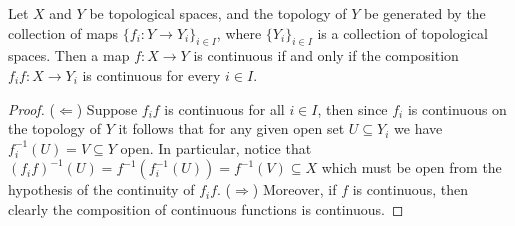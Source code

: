 \begin{proposition}
Let \(X\) and \(Y\) be topological spaces, and the topology of \(Y\) be
generated by the collection of maps \(\{f_i : Y \to Y_i\}_{i \in I}\), where
\(\{Y_i\}_{i \in I}\) is a collection of topological spaces. Then a map \(f :
X \to Y\) is continuous if and only if the composition \(f_i f : X \to
Y_i\) is continuous for every \(i \in I\).
\end{proposition}

\begin{proof}
(\(\Leftarrow\)) Suppose \(f_i f\) is continuous for all \(i \in I\),
then since \(f_i\) is continuous on the topology of \(Y\) it follows that for
any given open set \(U \subseteq Y_i\) we have \(f_i^{-1}(U) = V \subseteq Y\)
open. In particular, notice that \((f_i f)^{-1}(U) = f^{-1}(f_i^{-1}(U))
= f^{-1}(V) \subseteq X\) which must be open from the hypothesis of the
continuity of \(f_i f\). (\(\Rightarrow\)) Moreover, if \(f\) is
continuous, then clearly the composition of continuous functions is
continuous.
\end{proof}
